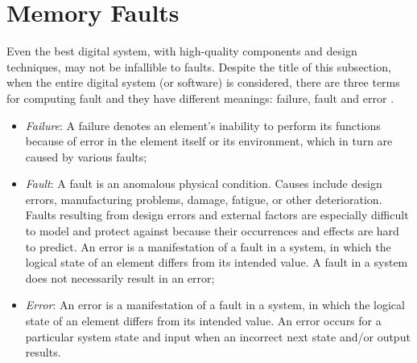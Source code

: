 \section{Memory Faults}

Even the best digital system, with high-quality components and design techniques, may not be infallible to faults. Despite the title of this subsection, when the entire digital system (or software) is considered, there are three terms for computing fault and they have different meanings: failure, fault and error \cite{Nelson1990}. 

\begin{itemize}
    \item \textit{Failure}: A failure denotes an element's inability to perform its functions because of error in the element itself or its environment, which in turn are caused by various faults;
    \item \textit{Fault}: A fault is an anomalous physical condition. Causes include design errors, manufacturing problems, damage, fatigue, or other deterioration. Faults resulting from design errors and external factors are especially difficult to model and protect against because their occurrences and effects are hard to predict. An error is a manifestation of a fault in a system, in which the logical state of an element differs from its intended value. A fault in a system does not necessarily result in an error;
    \item \textit{Error}: An error is a manifestation of a fault in a system, in which the logical state of an element differs from its intended value. An error occurs for a particular system state and input when an incorrect next state and/or output results.
\end{itemize}